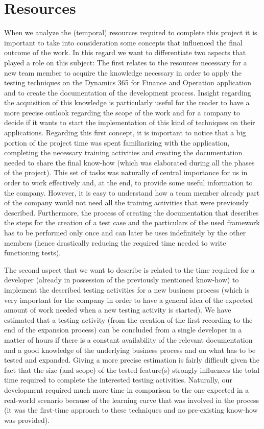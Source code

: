 \section{Resources} 

When we analyze the (temporal) resources required to complete this project it is important to take into consideration some concepts that influenced the final outcome of the work. In this regard we want to differentiate two aspects that played a role on this subject: 
The first relates to the resources necessary for a new team member to acquire the knowledge necessary in order to apply the testing techniques on the Dynamics 365 for Finance and Operation application and to create the documentation of the development process. Insight regarding the acquisition of this knowledge is particularly useful for the reader to have a more precise outlook regarding the scope of the work and for a company to decide if it wants to start the implementation of this kind of techniques on their applications. Regarding this first concept, it is important to notice that a big portion of the project time was spent familiarizing with the application, completing the necessary training activities and creating the documentation needed to share the final know-how (which was elaborated during all the phases of the project). This set of tasks was naturally of central importance for us in order to work effectively and, at the end, to provide some useful information to the company. However, it is easy to understand how a team member already part of the company would not need all the training activities that were previously described. Furthermore, the process of creating the documentation that describes the steps for the creation of a test case and the particulars of the used framework has to be performed only once and can later be uses indefinitely by the other members (hence drastically reducing the required time needed to write functioning tests).

The second aspect that we want to describe is related to the time required for a developer (already in possession of the previously mentioned know-how) to implement the described testing activities for a new business process (which is very important for the company in order to have a general idea of the expected amount of work needed when a new testing activity is started). We have estimated that a testing activity (from the creation of the first recording to the end of the expansion process) can be concluded from a single developer in a matter of hours if there is a constant availability of the relevant documentation and a good knowledge of the underlying business process and on what has to be tested and expanded. Giving a more precise estimation is fairly difficult given the fact that the size (and scope) of the tested feature(s) strongly influences the total time required to complete the interested testing activities. Naturally, our development required much more time in comparison to the one expected in a real-world scenario because of the learning curve that was involved in the process (it was the first-time approach to these techniques and no pre-existing know-how was provided).

